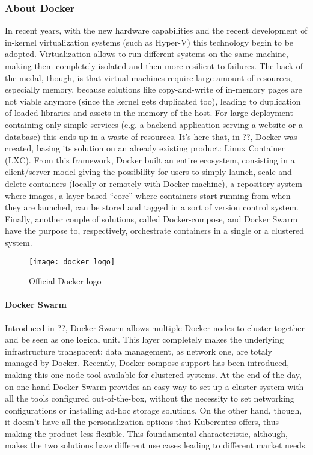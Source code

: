 \subsubsection{About Docker}

In recent years, with the new hardware capabilities and the recent development
of in-kernel virtualization systems (such as Hyper-V) this technology begin to
be adopted. Virtualization allows to run different systems on the same machine,
making them completely isolated and then more resilient to failures. The back of
the medal, though, is that virtual machines require large amount of resources,
especially memory, because solutions like copy-and-write of in-memory pages are
not viable anymore (since the kernel gets duplicated too), leading to
duplication of loaded libraries and assets in the memory of the host. For large
deployment containing only simple services (e.g. a backend application serving a
website or a database) this ends up in a waste of resources.  It's here that,
in ??, Docker was created, basing its solution
on an already existing product: Linux Container (LXC). From this framework,
Docker built an entire ecosystem, consisting in a client/server model giving the
possibility for users to simply launch, scale and delete containers (locally or
remotely with Docker-machine), a repository system where images, a layer-based
``core'' where containers start running from when they are launched, can be
stored and tagged in a sort of version control system. Finally, another couple
of solutions, called Docker-compose, and Docker Swarm have the purpose to,
respectively, orchestrate containers in a single or a clustered system.
\begin{figure}[t]
 \centering \texttt{[image: docker\_logo]}
 \caption{Official Docker logo}
 \label{chap:intro:img:docker_logo}
\end{figure}


\paragraph{Docker Swarm} Introduced in ??, Docker Swarm allows multiple Docker nodes to cluster together and be
seen as one logical unit. This layer completely makes the underlying
infrastructure transparent: data management, as network one, are totaly managed
by Docker. Recently, Docker-compose support has been introduced, making this
one-node tool available for clustered systems. At the end of the day, on one
hand Docker Swarm provides an easy way to set up a cluster system with all the
tools configured out-of-the-box, without the necessity to set networking
configurations or installing ad-hoc storage solutions. On the other hand,
though, it doesn't have all the personalization options that Kuberentes offers,
thus making the product less flexible. This foundamental characteristic,
although, makes the two solutions have different use cases leading to different
market needs. 


